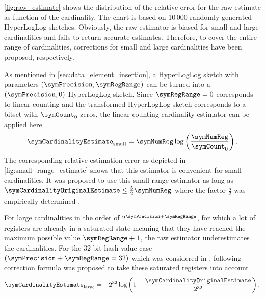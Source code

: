 \documentclass[a4paper]{scrartcl}
\begin{document}
\cref{fig:raw_estimate} shows the distribution of the relative error for the raw estimate as function of the cardinality. The chart is based on 10\,000 randomly generated HyperLogLog sketches. Obviously, the raw estimator is biased for small and large cardinalities and fails to return accurate estimates. Therefore, to cover the entire range of cardinalities, corrections for small and large cardinalities have been proposed, respectively.

As mentioned in \cref{sec:data_element_insertion}, a HyperLogLog sketch with parameters $(\symPrecision, \symRegRange)$ can be turned into a $(\symPrecision, 0)$-HyperLogLog sketch. Since $\symRegRange=0$ corresponds to linear counting and the transformed HyperLogLog sketch corresponds to a bitset with $\symCount_0$ zeros, the linear counting cardinality estimator \cite{Whang1990} can be applied here
\begin{equation}
\label{equ:small_range_estimate}
\symCardinalityEstimate_\text{small} = \symNumReg \log\left(
\frac{\symNumReg}{\symCount_0}
\right).
\end{equation}
The corresponding relative estimation error as depicted in \cref{fig:small_range_estimate} shows that this estimator is convenient for small cardinalities. It was proposed to use this small-range estimator as long as $\symCardinalityOriginalEstimate \leq \frac{5}{2}\symNumReg$ where the factor $\frac{5}{2}$ was empirically determined \cite{Flajolet2007}. 

For large cardinalities in the order of $2^{\symPrecision+\symRegRange}$, for which a lot of registers are already in a saturated state meaning that they have reached the maximum possible value $\symRegRange + 1$, the raw estimator underestimates the cardinalities. For the 32-bit hash value case $(\symPrecision+\symRegRange=32)$ which was considered in \cite{Flajolet2007}, following correction formula was proposed to take these saturated registers into account
\begin{equation}
\label{equ:large_range_estimate}
\symCardinalityEstimate_\text{large}
=
-2^{32}\log\left(1-\frac{\symCardinalityOriginalEstimate}{2^{32}}\right).
\end{equation}
\end{document}

